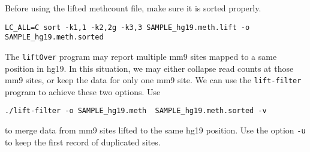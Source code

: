 \documentclass[10pt]{article}
\newcommand{\prog}[1]{\texttt{#1}}
\newcommand{\fn}[1]{\texttt{#1}}
\newcommand{\op}[1]{\texttt{#1}}
\begin{document}
{{Before using the lifted methcount file, make sure it is sorted properly.
\begin{verbatim}
LC_ALL=C sort -k1,1 -k2,2g -k3,3 SAMPLE_hg19.meth.lift -o SAMPLE_hg19.meth.sorted
\end{verbatim}
 
The \prog{liftOver} program may report multiple mm9 sites mapped to a same position in hg19. 
In this situation, we may either collapse read counts at those mm9 sites, 
or keep the data for only one mm9 site. We can use the \fn{lift-filter} program 
to achieve these two options. Use
\begin{verbatim}
./lift-filter -o SAMPLE_hg19.meth  SAMPLE_hg19.meth.sorted -v
 \end{verbatim}
to merge data from mm9 sites lifted to the same hg19 position. Use  
the option \op{-u} to keep the first record of duplicated sites. 

}}
\end{document}
